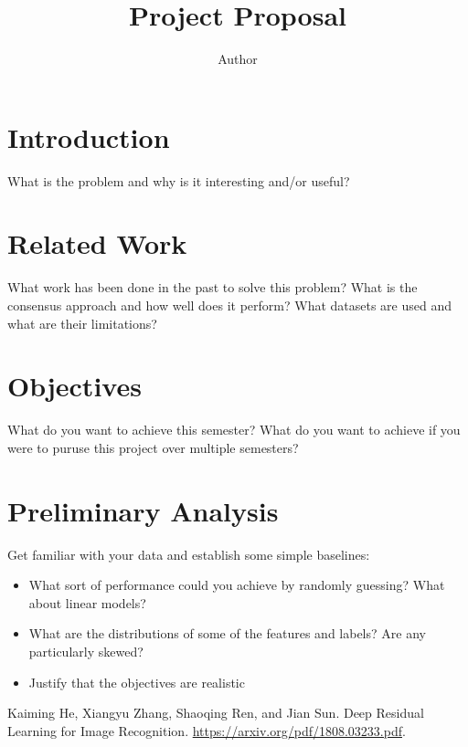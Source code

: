 \documentclass{article}
\title{Project Proposal}
\author{Author}
\begin{document}
\maketitle

\section{Introduction}
What is the problem and why is it interesting and/or useful?

\section{Related Work}
What work has been done in the past to solve this problem? What is the consensus approach and how well does it perform? What datasets are used and what are their limitations?

\section{Objectives}
What do you want to achieve this semester? What do you want to achieve if you were to puruse this project over multiple semesters?

\section{Preliminary Analysis}
Get familiar with your data and establish some simple baselines:
\begin{itemize}
    \item What sort of performance could you achieve by randomly guessing? What about linear models?
    \item What are the distributions of some of the features and labels? Are any particularly skewed?
    \item Justify that the objectives are realistic
\end{itemize}

\begin{thebibliography}{9}

 Kaiming He, Xiangyu Zhang, Shaoqing Ren, and Jian Sun. Deep Residual Learning for Image Recognition. \href{https://arxiv.org/pdf/1808.03233.pdf}{https://arxiv.org/pdf/1808.03233.pdf}.

\end{thebibliography}
\end{document}
